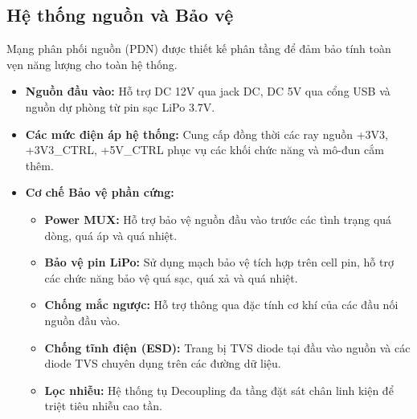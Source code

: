 \subsection{Hệ thống nguồn và Bảo vệ}
    Mạng phân phối nguồn (PDN) được thiết kế phân tầng để đảm bảo tính toàn vẹn năng lượng cho toàn hệ thống.
    \begin{itemize}
        \item \textbf{Nguồn đầu vào:} Hỗ trợ DC 12V qua jack DC, DC 5V qua cổng USB và nguồn dự phòng từ pin sạc LiPo 3.7V.
        \item \textbf{Các mức điện áp hệ thống:} Cung cấp đồng thời các ray nguồn +3V3, +3V3\_CTRL, +5V\_CTRL phục vụ các khối chức năng và mô-đun cắm thêm.
        \item \textbf{Cơ chế Bảo vệ phần cứng:}
        \begin{itemize}
            \item \textbf{Power MUX:} Hỗ trợ bảo vệ nguồn đầu vào trước các tình trạng quá dòng, quá áp và quá nhiệt.
            \item \textbf{Bảo vệ pin LiPo:} Sử dụng mạch bảo vệ tích hợp trên cell pin, hỗ trợ các chức năng bảo vệ quá sạc, quá xả và quá nhiệt.
            \item \textbf{Chống mắc ngược:} Hỗ trợ thông qua đặc tính cơ khí của các đầu nối nguồn đầu vào.
            \item \textbf{Chống tĩnh điện (ESD):} Trang bị TVS diode tại đầu vào nguồn và các diode TVS chuyên dụng trên các đường dữ liệu.
            \item \textbf{Lọc nhiễu:} Hệ thống tụ Decoupling đa tầng đặt sát chân linh kiện để triệt tiêu nhiễu cao tần.
        \end{itemize}
    \end{itemize}